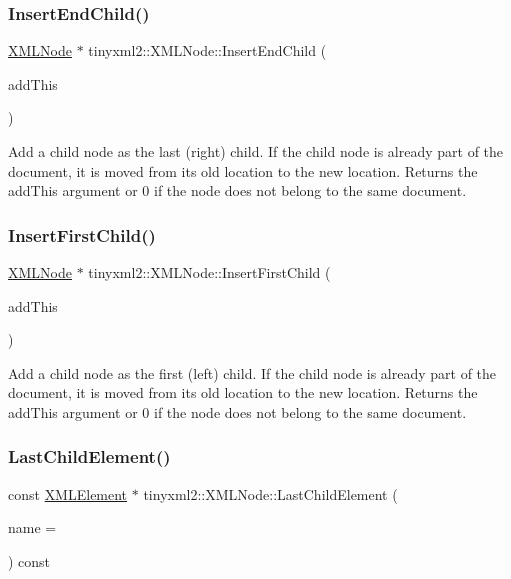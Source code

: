\subsubsection{\texorpdfstring{Insert\+End\+Child()}{InsertEndChild()}}
{\footnotesize\ttfamily \hyperlink{classtinyxml2_1_1_x_m_l_node}{X\+M\+L\+Node} $\ast$ tinyxml2\+::\+X\+M\+L\+Node\+::\+Insert\+End\+Child (\begin{DoxyParamCaption}\item[{\hyperlink{classtinyxml2_1_1_x_m_l_node}{X\+M\+L\+Node} $\ast$}]{add\+This }\end{DoxyParamCaption})}

Add a child node as the last (right) child. If the child node is already part of the document, it is moved from its old location to the new location. Returns the add\+This argument or 0 if the node does not belong to the same document. \mbox{\label{classtinyxml2_1_1_x_m_l_node_ac609a8f3ea949027f439280c640bbaf2}} 
\subsubsection{\texorpdfstring{Insert\+First\+Child()}{InsertFirstChild()}}
{\footnotesize\ttfamily \hyperlink{classtinyxml2_1_1_x_m_l_node}{X\+M\+L\+Node} $\ast$ tinyxml2\+::\+X\+M\+L\+Node\+::\+Insert\+First\+Child (\begin{DoxyParamCaption}\item[{\hyperlink{classtinyxml2_1_1_x_m_l_node}{X\+M\+L\+Node} $\ast$}]{add\+This }\end{DoxyParamCaption})}

Add a child node as the first (left) child. If the child node is already part of the document, it is moved from its old location to the new location. Returns the add\+This argument or 0 if the node does not belong to the same document. \mbox{\label{classtinyxml2_1_1_x_m_l_node_a609e02f02044f39b928d1a3e0de9f532}} 
\subsubsection{\texorpdfstring{Last\+Child\+Element()}{LastChildElement()}}
{\footnotesize\ttfamily const \hyperlink{classtinyxml2_1_1_x_m_l_element}{X\+M\+L\+Element} $\ast$ tinyxml2\+::\+X\+M\+L\+Node\+::\+Last\+Child\+Element (\begin{DoxyParamCaption}\item[{const char $\ast$}]{name = {} }\end{DoxyParamCaption}) const}

